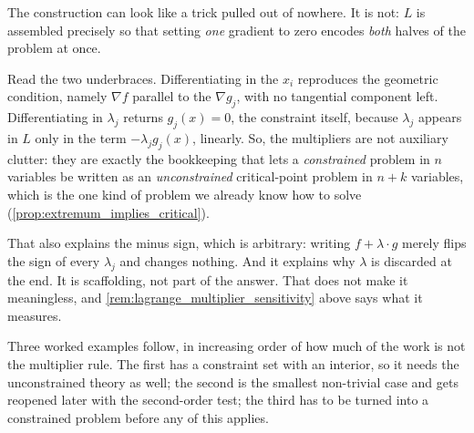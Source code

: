 \begin{remark}
\label{rem:why_the_lagrangian}
The construction can look like a trick pulled out of nowhere. It is not: $L$ is assembled
precisely so that setting \emph{one} gradient to zero encodes \emph{both} halves of the problem
at once.

Read the two underbraces. Differentiating in the $x_i$ reproduces the geometric condition, namely
$\nabla f$ parallel to the $\nabla g_j$, with no tangential component left. Differentiating in
$\lambda_j$ returns $g_j(x)=0$, the constraint itself, because $\lambda_j$ appears in $L$ only
in the term $-\lambda_jg_j(x)$, linearly. So, the multipliers are not auxiliary clutter: they are
exactly the bookkeeping that lets a \emph{constrained} problem in $n$ variables be written as an
\emph{unconstrained} critical-point problem in $n+k$ variables, which is the one kind of problem
we already know how to solve (\cref{prop:extremum_implies_critical}).

That also explains the minus sign, which is arbitrary: writing $f + \lambda\cdot g$ merely flips
the sign of every $\lambda_j$ and changes nothing. And it explains why $\lambda$ is discarded at
the end. It is scaffolding, not part of the answer. That does not make it meaningless, and
\cref{rem:lagrange_multiplier_sensitivity} above says what it measures.
\end{remark}

Three worked examples follow, in increasing order of how much of the work is not the multiplier
rule. The first has a constraint set with an interior, so it needs the unconstrained theory as
well; the second is the smallest non-trivial case and gets reopened later with the second-order
test; the third has to be turned into a constrained problem before any of this applies.


